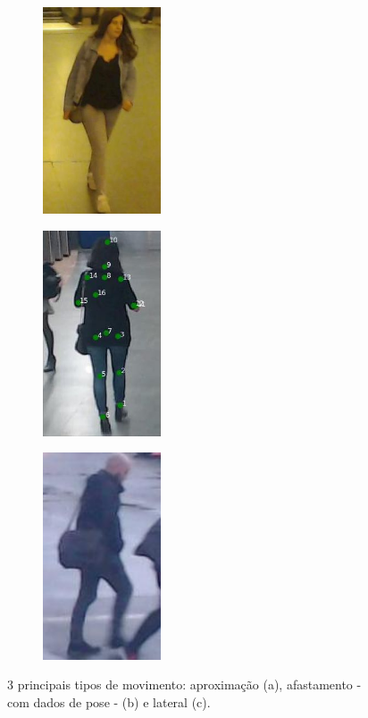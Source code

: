 \begin{figure} [h]
  \centering
  \begin{subfigure}{4cm}
    \centering\includegraphics[width=3.5cm]{aproxima.jpg}
    \caption{}
  \end{subfigure}
  \begin{subfigure}{4cm}
    \centering\includegraphics[width=3.5cm]{esqueleto.jpg}
    \caption{}
  \end{subfigure}
  \begin{subfigure}{4cm}
    \centering\includegraphics[width=3.5cm]{lateral.jpg}
    \caption{}
  \end{subfigure}
  \caption{3 principais tipos de movimento: aproximação (a), afastamento - com dados de pose - (b) e lateral (c).}
  \label{fig:movimentos}
\end{figure}

